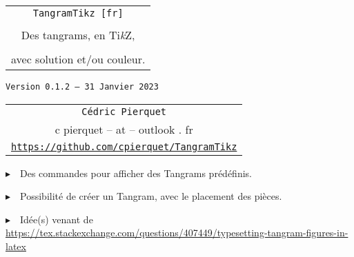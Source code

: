 \documentclass{article}
\def\TPversion{0.1.2}
\def\TPdate{31 Janvier 2023}
\begin{document}
\pagestyle{fancy}

\thispagestyle{empty}

\vspace{2cm}

\begin{center}
	\begin{minipage}{0.75\linewidth}
	\begin{tcolorbox}[colframe=yellow,colback=yellow!15]
		\begin{center}
			\begin{tabular}{c}
				{\Huge \texttt{TangramTikz [fr]}}\\
				\\
				{\LARGE Des tangrams, en Ti\textit{k}Z}, \\
				\\
				{\LARGE avec solution et/ou couleur.} \\
			\end{tabular}
			
			\medskip
			
			{\small \texttt{Version \TPversion{} -- \TPdate}}
		\end{center}
	\end{tcolorbox}
\end{minipage}
\end{center}

\vspace{0.5cm}

\begin{center}
	\begin{tabular}{c}
	\texttt{Cédric Pierquet}\\
	{\ttfamily c pierquet -- at -- outlook . fr}\\
	\texttt{\url{https://github.com/cpierquet/TangramTikz}}
\end{tabular}
\end{center}

\vspace{0.5cm}

{$\blacktriangleright$~~Des commandes pour afficher des Tangrams prédéfinis.}

\smallskip

{$\blacktriangleright$~~Possibilité de créer un Tangram, avec le placement des pièces.}

\smallskip

{$\blacktriangleright$~~Idée(s) venant de \url{https://tex.stackexchange.com/questions/407449/typesetting-tangram-figures-in-latex}}

\vspace{1cm}
\end{document}

